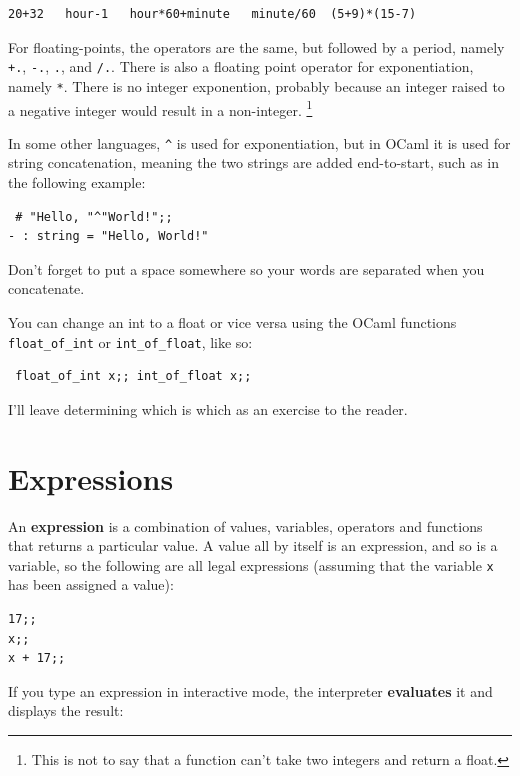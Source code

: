 \documentclass[10pt]{book}
\begin{document}
\beforeverb
\begin{verbatim}
20+32   hour-1   hour*60+minute   minute/60  (5+9)*(15-7)
\end{verbatim}
\afterverb

For floating-points, the operators are the same, but followed by a period, namely 
{\tt +.}, {\tt -.}, {\tt *.}, and {\tt /.}. There is also a floating point operator for
exponentiation, namely {\tt **}. There is no integer exponention, probably because an integer
raised to a negative integer would result in a non-integer. \footnote{This is not to say that 
a function can't take two integers and return a float.}

In some other languages, \verb"^" is used for exponentiation, but
in OCaml it is used for string concatenation, meaning the two strings 
are added end-to-start, such as in the following example:

\beforeverb
\begin{verbatim}
 # "Hello, "^"World!";;
- : string = "Hello, World!"
\end{verbatim}
\afterverb

Don't forget to put a space somewhere so your words are separated 
when you concatenate.

You can change an int to a float or vice versa using the 
OCaml functions \verb"float_of_int" or \verb"int_of_float", like so:

\beforeverb
\begin{verbatim}
 float_of_int x;; int_of_float x;;
\end{verbatim}
\afterverb

I'll leave determining which is which as an exercise to the reader.

\section{Expressions}

An {\bf expression} is a combination of values, variables, operators
and functions that returns a particular value. A value all by itself 
is an expression, and so is a variable, so the following are all legal 
expressions (assuming that the variable {\tt x} has been assigned a value):


\beforeverb
\begin{verbatim}
17;;
x;;
x + 17;;
\end{verbatim}
\afterverb
%
If you type an expression in interactive mode, the interpreter
{\bf evaluates} it and displays the result:
\end{document}
